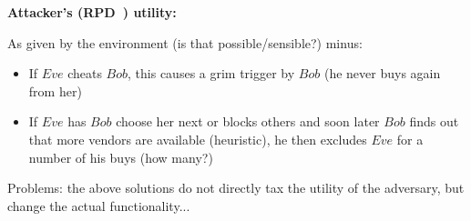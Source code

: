 \textbf{Attacker's (RPD~\cite{rationalprotocol}) utility:}

As given by the environment (is that possible/sensible?) minus:

\begin{itemize}
  \item If $Eve$ cheats $Bob$, this causes a grim trigger by $Bob$ (he never buys again
  from her)
  \item If $Eve$ has $Bob$ choose her next or blocks others and soon later $Bob$ finds out
  that more vendors are available (heuristic), he then excludes $Eve$ for a number of his
  buys (how many?)
\end{itemize}

Problems: the above solutions do not directly tax the utility of the adversary, but change
the actual functionality...
